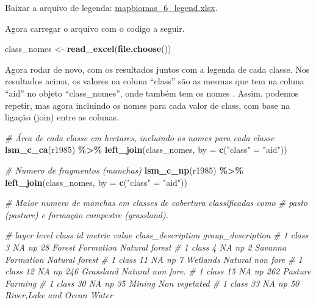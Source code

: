 \documentclass[
]{article}
\newenvironment{Shaded}{\begin{snugshade}}{\end{snugshade}}
\newcommand{\AttributeTok}[1]{\textcolor[rgb]{0.13,0.29,0.53}{#1}}
\newcommand{\CommentTok}[1]{\textcolor[rgb]{0.56,0.35,0.01}{\textit{#1}}}
\newcommand{\FunctionTok}[1]{\textcolor[rgb]{0.13,0.29,0.53}{\textbf{#1}}}
\newcommand{\NormalTok}[1]{#1}
\newcommand{\OtherTok}[1]{\textcolor[rgb]{0.56,0.35,0.01}{#1}}
\newcommand{\SpecialCharTok}[1]{\textcolor[rgb]{0.81,0.36,0.00}{\textbf{#1}}}
\newcommand{\StringTok}[1]{\textcolor[rgb]{0.31,0.60,0.02}{#1}}
\begin{document}
Baixar a arquivo de legenda: \href{https://github.com/darrennorris/Amapa-mine/blob/main/data/raster/Mapbiomas_cover_lourenco_utm/mapbiomas_6_legend.xlsx}{mapbiomas\_6\_legend.xlsx}.

Agora carregar o arquivo com o codigo a seguir.

\begin{Shaded}
\begin{Highlighting}[]
\NormalTok{class\_nomes }\OtherTok{\textless{}{-}} \FunctionTok{read\_excel}\NormalTok{(}\FunctionTok{file.choose}\NormalTok{())}
\end{Highlighting}
\end{Shaded}

Agora rodar de novo, com os resultados juntos com a legenda
de cada classe. Nos resultados acima, os valores na coluna ``class''
são as mesmas que tem na coluna ``aid'' no objeto ``class\_nomes'', onde também
tem os nomes . Assim, podemos repetir, mas agora incluindo os nomes
para cada valor de class, com base na ligação (join) entre as colunas.

\begin{Shaded}
\begin{Highlighting}[]
\CommentTok{\# Área de cada classe em hectares, incluindo os nomes para cada classe}
\FunctionTok{lsm\_c\_ca}\NormalTok{(r1985) }\SpecialCharTok{\%\textgreater{}\%} 
  \FunctionTok{left\_join}\NormalTok{(class\_nomes, }\AttributeTok{by =} \FunctionTok{c}\NormalTok{(}\StringTok{"class"} \OtherTok{=} \StringTok{"aid"}\NormalTok{))}
  
\CommentTok{\# Numero de fragmentos (manchas)}
\FunctionTok{lsm\_c\_np}\NormalTok{(r1985) }\SpecialCharTok{\%\textgreater{}\%} 
  \FunctionTok{left\_join}\NormalTok{(class\_nomes, }\AttributeTok{by =} \FunctionTok{c}\NormalTok{(}\StringTok{"class"} \OtherTok{=} \StringTok{"aid"}\NormalTok{))}
  
\CommentTok{\# Maior numero de manchas em classes de cobertura classificadas como }
\CommentTok{\# pasto (pasture) e formação campestre (grassland).}

\CommentTok{\#  layer level class    id metric value class\_description  group\_description}
\CommentTok{\#     1 class     3    NA np        28 Forest Formation     Natural forest         }
\CommentTok{\#     1 class     4    NA np         2 Savanna Formation    Natural forest           }
\CommentTok{\#     1 class    11    NA np         7 Wetlands             Natural non fore}
\CommentTok{\#     1 class    12    NA np       246 Grassland            Natural non fore.           }
\CommentTok{\#     1 class    15    NA np       262 Pasture              Farming              }
\CommentTok{\#     1 class    30    NA np        35 Mining               Non vegetated           }
\CommentTok{\#     1 class    33    NA np        50 River,Lake and Ocean Water             }
\end{Highlighting}
\end{Shaded}
\end{document}
